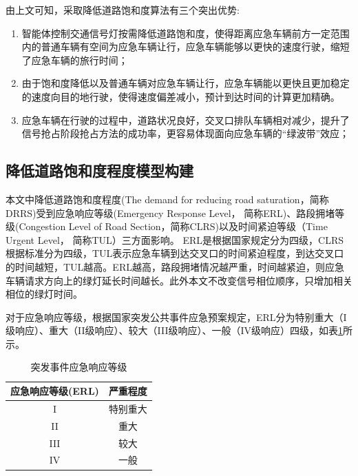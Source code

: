 由上文可知，采取降低道路饱和度算法有三个突出优势:
\begin{enumerate}
	\item 智能体控制交通信号灯按需降低道路饱和度，使得距离应急车辆前方一定范围内的普通车辆有空间为应急车辆让行，应急车辆能够以更快的速度行驶，缩短了应急车辆的旅行时间；
	\item 由于饱和度降低以及普通车辆对应急车辆让行，应急车辆能以更快且更加稳定的速度向目的地行驶，使得速度偏差减小，预计到达时间的计算更加精确。
	\item 应急车辆在行驶的过程中，道路状况良好，交叉口排队车辆相对减少，提升了信号抢占阶段抢占方法的成功率，更容易体现面向应急车辆的“绿波带”效应；
	
\end{enumerate}

\subsection{降低道路饱和度程度模型构建}

本文中降低道路饱和度程度(The demand for reducing road saturation，简称DRRS)受到应急响应等级(Emergency Response Level， 简称ERL)、路段拥堵等级(Congestion Level of Road Section，简称CLRS)以及时间紧迫等级（Time Urgent Level， 简称TUL）三方面影响。
ERL是根据国家规定\cite{erl_2019}分为四级，CLRS根据标准\cite{GA_T_115_2020}分为四级，TUL表示应急车辆到达交叉口的时间紧迫程度，到达交叉口的时间越短，TUL越高。ERL越高，路段拥堵情况越严重，时间越紧迫，则应急车辆请求方向上的绿灯延长时间越长。此外本文不改变信号相位顺序，只增加相关相位的绿灯时间。



对于应急响应等级，根据国家突发公共事件应急预案规定\cite{erl_2019}，ERL分为特别重大（I级响应）、重大（II级响应）、较大（III级响应）、一般（IV级响应）四级，如表\ref{table:ERL}所示。
\begin{table}[H]
	\centering
	\caption{突发事件应急响应等级}
	\label{table:ERL}
	\begin{tabular}{|c|c|}
		\hline
		应急响应等级(ERL) & 严重程度 \\ \hline
		I & 特别重大 \\ \hline
		II & 重大 \\ \hline
		III & 较大 \\ \hline
		IV & 一般 \\ \hline
	\end{tabular}
\end{table}

